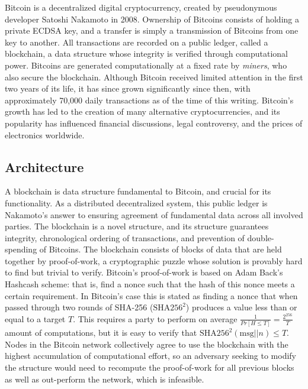 Bitcoin is a decentralized digital cryptocurrency, created by pseudonymous developer Satoshi Nakamoto in 2008. Ownership of Bitcoins consists of holding a private ECDSA key, and a transfer is simply a transmission of Bitcoins from one key to another. All transactions are recorded on a public ledger, called a blockchain, a data structure whose integrity is verified through computational power. Bitcoins are generated computationally at a fixed rate by \textit{miners}, who also secure the blockchain. Although Bitcoin received limited attention in the first two years of its life, it has since grown significantly since then, with approximately 70,000 daily transactions as of the time of this writing. Bitcoin's growth has led to the creation of many alternative cryptocurrencies, and its popularity has influenced financial discussions, legal controversy, and the prices of electronics worldwide.

\subsection{Architecture}

A blockchain is data structure fundamental to Bitcoin, and crucial for its functionality. As a distributed decentralized system, this public ledger is Nakamoto's answer to ensuring agreement of fundamental data across all involved parties. The blockchain is a novel structure, and its structure guarantees integrity, chronological ordering of transactions, and prevention of double-spending of Bitcoins. The blockchain consists of blocks of data that are held together by proof-of-work, a cryptographic puzzle whose solution is provably hard to find but trivial to verify. Bitcoin's proof-of-work is based on Adam Back's Hashcash scheme: that is, find a nonce such that the hash of this nonce meets a certain requirement. In Bitcoin's case this is stated as finding a nonce that when passed through two rounds of SHA-256 ($ \textrm{SHA}256^{{2}} $) produces a value less than or equal to a target $ T $. This requires a party to perform on average $ \frac{1}{Pr[H \leq T]} = \frac{2 ^ {{256}}}{T} $ amount of computations, but it is easy to verify that $ \textrm{SHA}256^{{2}}(\textrm{msg} || n) \leq T $. Nodes in the Bitcoin network collectively agree to use the blockchain with the highest accumulation of computational effort, so an adversary seeking to modify the structure would need to recompute the proof-of-work for all previous blocks as well as out-perform the network, which is infeasible.\cite{Okupski2014}

